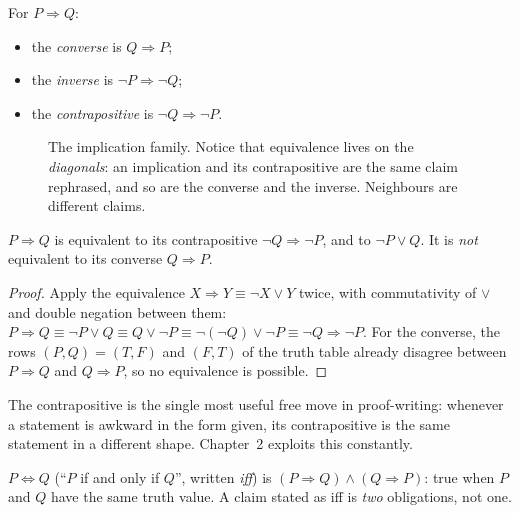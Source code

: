 \begin{definition}
For $P \Rightarrow Q$:
\begin{itemize}
\item the \emph{converse} is $Q \Rightarrow P$;
\item the \emph{inverse} is $\lnot P \Rightarrow \lnot Q$;
\item the \emph{contrapositive} is $\lnot Q \Rightarrow \lnot P$.
\end{itemize}
\end{definition}

\begin{figure}[ht]\centering

\caption{The implication family. Notice that equivalence lives on the
\emph{diagonals}: an implication and its contrapositive are the same claim
rephrased, and so are the converse and the inverse. Neighbours are different claims.}
\label{fig:family}
\end{figure}

\begin{theorem}\label{thm:contrapositive}
$P \Rightarrow Q$ is equivalent to its contrapositive $\lnot Q \Rightarrow \lnot P$,
and to $\lnot P \lor Q$. It is \emph{not} equivalent to its converse
$Q \Rightarrow P$.
\end{theorem}

\begin{proof}
Apply the equivalence $X \Rightarrow Y \equiv \lnot X \lor Y$ twice, with
commutativity of $\lor$ and double negation between them:
$P \Rightarrow Q \equiv \lnot P \lor Q \equiv Q \lor \lnot P
\equiv \lnot(\lnot Q) \lor \lnot P \equiv \lnot Q \Rightarrow \lnot P$.
For the converse, the rows $(P,Q)=(T,F)$ and $(F,T)$ of the truth table already
disagree between $P\Rightarrow Q$ and $Q\Rightarrow P$, so no equivalence is possible.
\end{proof}

The contrapositive is the single most useful free move in proof-writing: whenever a
statement is awkward in the form given, its contrapositive is the same statement in a
different shape. Chapter~2 exploits this constantly.

\begin{definition}[Biconditional]
$P \iff Q$ (``$P$ if and only if $Q$'', written \emph{iff}) is
$(P \Rightarrow Q) \land (Q \Rightarrow P)$: true when $P$ and $Q$ have the same
truth value. A claim stated as iff is \emph{two} obligations, not one.
\end{definition}

